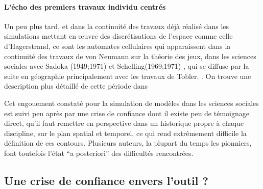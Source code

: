 
\paragraph{L'écho des premiers travaux individu centrés}

Un peu plus tard, et dans la continuité des travaux déjà réalisé dans les simulations mettant en œuvre des discrétisations de l'espace comme celle d'Hagerstrand, ce sont les automates cellulaires qui apparaissent dans la continuité des travaux de von Neumann sur la théorie des jeux, dans les sciences sociales avec Sadoka (1949;1971) et Schelling(1969;1971) \autocite{Ganguly2003}, qui se diffuse par la suite en géographie principalement avec les travaux de Tobler. \autocite{Tobler1970b} \autocite{Tobler1979}. On trouve une description plus détaillé de cette période dans \autocite{Louail2010}



Cet engouement constaté pour la simulation de modèles dans les sciences sociales est suivi peu après par une crise de confiance dont il existe peu de témoignage direct, qu'il faut remettre en perspective dans un historique propre à chaque discipline, sur le plan spatial et temporel, ce qui rend extrêmement difficile la définition de ces contours. Plusieurs auteurs, la plupart du temps les pionniers, font toutefois l'état \foreignquote{latin}{a posteriori} des difficultés rencontrées.


\subsection{Une crise de confiance envers l'outil ?}
\label{sec:critiques_simulation}


